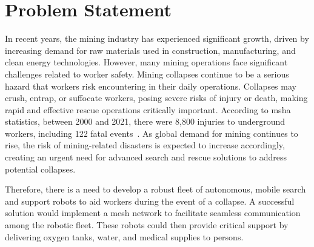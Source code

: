 \section{Problem Statement}
\label{sec:problem_statement}

In recent years, the mining industry has experienced significant growth, driven by increasing demand for raw materials used in construction, manufacturing, and clean energy technologies. However, many mining operations face significant challenges related to worker safety. Mining collapses continue to be a serious hazard that workers risk encountering in their daily operations. Collapses may crush, entrap, or suffocate workers, posing severe risks of injury or death, making rapid and effective rescue operations critically important. According to \gls{msha} statistics, between 2000 and 2021, there were 8,800 injuries to underground workers, including 122 fatal events~\cite{cdc_groundfalls}. As global demand for mining continues to rise, the risk of mining-related disasters is expected to increase accordingly, creating an urgent need for advanced search and rescue solutions to address potential collapses. 

Therefore, there is a need to develop a robust fleet of autonomous, mobile search and support robots to aid workers during the event of a collapse. A successful solution would implement a mesh network to facilitate seamless communication among the robotic fleet. These robots could then provide critical support by delivering oxygen tanks, water, and medical supplies to \gls{persons}.
